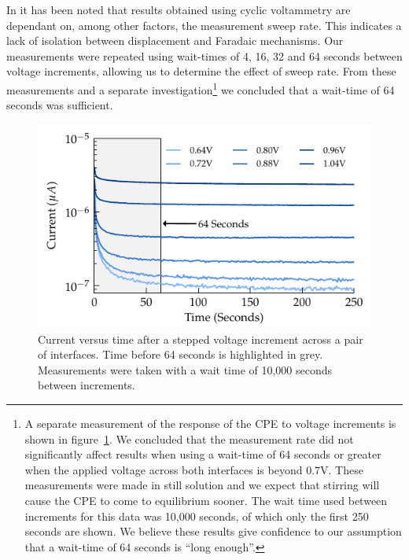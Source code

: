 \documentclass[journal, a4paper]{IEEEtran}
\begin{document}
In \cite{Cogan2008} it has been noted that results obtained using cyclic voltammetry are dependant on, among other factors, the measurement sweep rate. This indicates a lack of isolation between displacement and Faradaic mechanisms. Our measurements were repeated using wait-times of 4, 16, 32 and 64 seconds between voltage increments, allowing us to determine the effect of sweep rate. From these measurements and a separate investigation\footnote{A separate measurement of the response of the CPE to voltage increments is shown in figure~\ref{fig:CPE_currentVsTime}. We concluded that the measurement rate did not significantly affect results when using a wait-time of 64 seconds or greater when the applied voltage across both interfaces is beyond 0.7\thinspace V. These measurements were made in still solution and we expect that stirring will cause the CPE to come to equilibrium sooner. The wait time used between increments for this data was 10,000 seconds, of which only the first 250 seconds are shown. We believe these results give confidence to our assumption that a wait-time of 64 seconds is ``long enough''.} we concluded that a wait-time of 64 seconds was sufficient.
\begin{figure}
    \begin{center}
        \includegraphics{graphics/CPE_currentVsTime}
    \end{center}
    \caption{Current versus time after a stepped voltage increment across a pair of interfaces. Time before 64 seconds is highlighted in grey. Measurements were taken with a wait time of 10,000 seconds between increments.}
    \label{fig:CPE_currentVsTime}
\end{figure}
\end{document}
